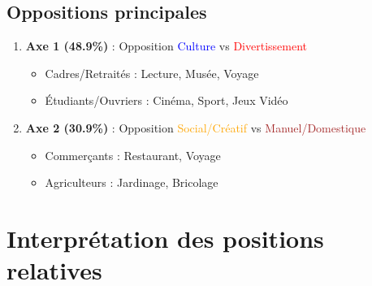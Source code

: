 \documentclass[12pt,a4paper]{book}
\begin{document}
	\subsection{Oppositions principales}
	
	\begin{enumerate}
		\item \textbf{Axe 1 (48.9\%)} : Opposition \textcolor{blue}{Culture} vs \textcolor{red}{Divertissement}
		\begin{itemize}
			\item Cadres/Retraités : Lecture, Musée, Voyage
			\item Étudiants/Ouvriers : Cinéma, Sport, Jeux Vidéo
		\end{itemize}
		
		\item \textbf{Axe 2 (30.9\%)} : Opposition \textcolor{orange}{Social/Créatif} vs \textcolor{brown}{Manuel/Domestique}
		\begin{itemize}
			\item Commerçants : Restaurant, Voyage
			\item Agriculteurs : Jardinage, Bricolage
		\end{itemize}
	\end{enumerate}
	
	\section{Interprétation des positions relatives}
	
	\begin{center}
	\end{center}
	
\end{document}

